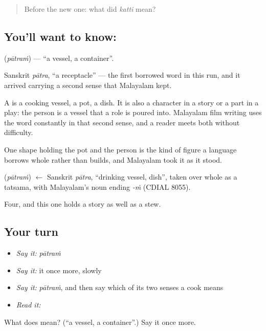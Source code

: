 \begin{quote}
Before the new one: what did \emph{katti} mean?
\end{quote}

\subsection*{You'll want to know: }
\textbf{} (\emph{pātraṁ}) — \textquotedblleft{}a vessel, a container\textquotedblright{}.

Sanskrit \emph{pātra}, \textquotedblleft{}a receptacle\textquotedblright{} — the first borrowed word in this run, and it arrived carrying a second sense that Malayalam kept.

A  is a cooking vessel, a pot, a dish. It is also a character in a story or a part in a play: the person is a vessel that a role is poured into. Malayalam film writing uses the word constantly in that second sense, and a reader meets both without difficulty.

One shape holding the pot and the person is the kind of figure a language borrows whole rather than builds, and Malayalam took it as it stood.

\begin{cousinweb}
\textbf{} (\emph{pātraṁ}) $\leftarrow$ Sanskrit \emph{pātra}, \textquotedblleft{}drinking vessel, dish\textquotedblright{}, taken over whole as a tatsama, with Malayalam's noun ending \emph{-ṁ} (CDIAL 8055).
\end{cousinweb}

\begin{grammarlens}[title={What you've built}]
Four, and this one holds a story as well as a stew.
\end{grammarlens}

\subsection*{Your turn}
\begin{itemize}
\raggedright
  \item \emph{Say it:} \emph{pātraṁ}
  \item \emph{Say it:} it once more, slowly
  \item \emph{Say it:} \emph{pātraṁ}, and then say which of its two senses a cook means
  \item \emph{Read it:} \textbf{}
\end{itemize}

\begin{tcolorbox}[breakable,colback=teal!4,colframe=teal!35!black,title={Before you move on}]
What does  mean? (\textquotedblleft{}a vessel, a container\textquotedblright{}.) Say it once more.
\end{tcolorbox}
